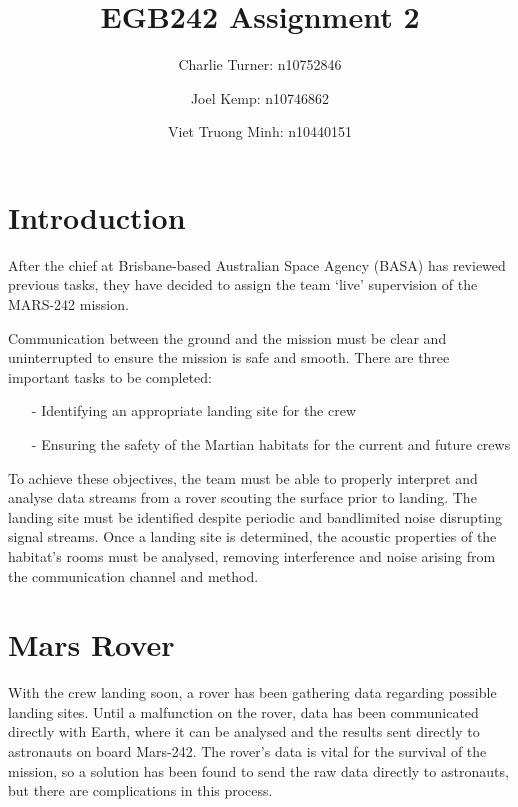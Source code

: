 \documentclass[12pt]{article}
\author{
    Charlie Turner: n10752846
    \and
    Joel Kemp: n10746862
    \and
    Viet Truong Minh: n10440151
}
\title{EGB242 Assignment 2}
\begin{document}
\begin{titlingpage}
    \maketitle
\end{titlingpage}

\section*{Introduction}

After the chief at Brisbane-based Australian Space Agency (BASA) has reviewed
previous tasks, they have decided to assign the team `live' supervision of the
MARS-242 mission.

Communication between the ground and the mission must be clear and
uninterrupted to ensure the mission is safe and smooth. There are three
important tasks to be completed:
\begin{itemize}
    \item[-] Identifying an appropriate landing site for the crew
    \item[-] Ensuring the safety of the Martian habitats for the current and future crews
\end{itemize}

\noindent To achieve these objectives, the team must be able to properly interpret and
analyse data streams from a rover scouting the surface prior to landing.
The landing site must be identified despite periodic and bandlimited noise
disrupting signal streams. Once a landing site is determined, the acoustic
properties of the habitat's rooms must be analysed, removing interference and
noise arising from the communication channel and method.

%
%
\section{Mars Rover}

With the crew landing soon, a rover has been gathering data regarding possible
landing sites. Until a malfunction on the rover, data has been communicated
directly with Earth, where it can be analysed and the results sent directly to
astronauts on board Mars-242. The rover's data is vital for the survival of the
mission, so a solution has been found to send the raw data directly to
astronauts, but there are complications in this process.
\end{document}
